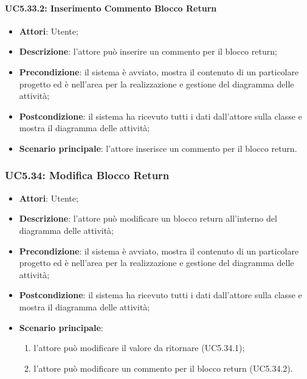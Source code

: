 \paragraph{UC5.33.2: Inserimento Commento Blocco Return}
\label{UC5.33.2}
\begin{itemize}
	\item \textbf{Attori}: Utente;
	\item \textbf{Descrizione}: l'attore può inserire un commento per il blocco return;
	\item \textbf{Precondizione}: il sistema è avviato, mostra il contenuto di un particolare progetto ed è nell'area per la realizzazione e gestione del diagramma delle attività;
	\item \textbf{Postcondizione}: il sistema ha ricevuto tutti i dati dall'attore sulla classe e mostra il diagramma delle attività;
	\item \textbf{Scenario principale}: l'attore inserisce un commento per il blocco return.
\end{itemize}

\subsubsection{UC5.34: Modifica Blocco Return}
\label{UC5.34}
\begin{itemize}
	\item \textbf{Attori}: Utente;
	\item \textbf{Descrizione}: l'attore può modificare un blocco return all'interno del diagramma delle attività;
	\item \textbf{Precondizione}: il sistema è avviato, mostra il contenuto di un particolare progetto ed è nell'area per la realizzazione e gestione del diagramma delle attività;
	\item \textbf{Postcondizione}: il sistema ha ricevuto tutti i dati dall'attore sulla classe e mostra il diagramma delle attività;
	\item \textbf{Scenario principale}: 
		\begin{enumerate}
		\item l'attore può modificare il valore da ritornare (UC5.34.1);
		\item l'attore può modificare un commento per il blocco return (UC5.34.2).
		\end{enumerate}
\end{itemize}

